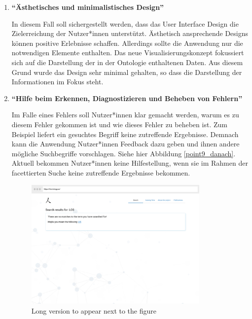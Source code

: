 \begin{enumerate}
\clearpage


\item \textbf{\enquote{Ästhetisches und minimalistisches Design}} \newline

In diesem Fall soll sichergestellt werden, dass das User Interface Design die Zielerreichung der Nutzer*innen unterstützt.
Ästhetisch ansprechende Designs können positive Erlebnisse schaffen. 
Allerdings sollte die Anwendung nur die notwendigen Elemente enthalten. 
Das neue Visualisierungskonzept fokussiert sich auf die Darstellung der in der Ontologie enthaltenen Daten.
Aus diesem Grund wurde das Design sehr minimal gehalten, so dass die Darstellung der Informationen im Fokus steht.


\item \textbf{\enquote{Hilfe beim Erkennen, Diagnostizieren und Beheben von Fehlern}} \newline

Im Falle eines Fehlers soll Nutzer*innen klar gemacht werden, warum es zu diesem Fehler gekommen ist und wie dieses Fehler zu beheben ist.
Zum Beispiel liefert ein gesuchtes Begriff keine zutreffende Ergebnisse.
Demnach kann die Anwendung Nutzer*innen Feedback dazu geben und ihnen andere mögliche Suchbegriffe vorschlagen.
Siehe hier Abbildung \ref{point9_danach}.
Aktuell bekommen Nutzer*innen keine Hilfestellung, wenn sie im Rahmen der facettierten Suche keine zutreffende Ergebnisse bekommen.

\begin{figure}
	\centering
    	\includegraphics[width=0.85\textwidth]{Images/Mockup_Ergebnisseite_3}
   	\caption[Suchergebnisse mit Suchbegriff]{Long version to appear next to the figure}
   	\label{fig:point9_danach}
\end{figure}


\end{enumerate}
